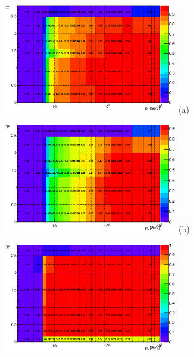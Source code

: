 \begin{figure}[htbp]
  \begin{center}
    \begin{minipage}[t]{.45\textwidth}
      \centering
      \includegraphics[width=75mm]{figures/BGestimation/ObjReplacement/method/lepeff/el_trPtEta_truthToID.eps}
      \hspace{10mm} (a)
      \label{fig::BGestimation::objRep::heff_mc_el_truthToID}
    \end{minipage}
    \begin{minipage}[t]{.45\textwidth}
      \centering
      \includegraphics[width=75mm]{figures/BGestimation/ObjReplacement/method/lepeff/el_trPtEta_truthToSig.eps}
      \hspace{10mm} (b)
      \label{fig::BGestimation::objRep::heff_mc_el_truthToSig}
    \end{minipage}
    \begin{minipage}[t]{.45\textwidth}
      \centering
      \includegraphics[width=75mm]{figures/BGestimation/ObjReplacement/method/lepeff/mu_trPtEta_truthToID.eps}

\end{minipage}
\end{center}
\end{figure}
